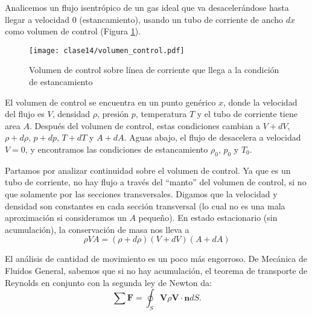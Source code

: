 Analicemos un flujo isentrópico de un gas ideal que va desacelerándose hasta llegar a velocidad 0 (estancamiento), usando un tubo de corriente de ancho $dx$ como volumen de control (Figura \ref{fig:volumen_control}).
%
\begin{figure}
\centering
\texttt{[image: clase14/volumen\_control.pdf]}
\caption{Volumen de control sobre línea de corriente que llega a la condición de estancamiento}
\label{fig:volumen_control}
\end{figure}
%
El volumen de control se encuentra en un punto genérico $x$, donde la velocidad del flujo es $V$, densidad $\rho$, presión $p$, temperatura $T$ y el tubo de corriente tiene area $A$. 
Después del volumen de control, estas condiciones cambian a $V+dV$, $\rho+d\rho$, $p+dp$, $T+dT$ y $A+dA$.
Aguas abajo, el flujo de desacelera a velocidad $V=0$, y encontramos las condiciones de estancamiento $\rho_0$, $p_0$ y $T_0$.

Partamos por analizar continuidad sobre el volumen de control.
Ya que es un tubo de corriente, no hay flujo a través del ``manto'' del volumen de control, si no que solamente por las secciones transversales.
Digamos que la velocidad y densidad son constantes en cada sección transversal (lo cual no es una mala aproximación si consideramos un $A$ pequeño).
En estado estacionario (sin acumulación), la conservación de masa nos lleva a
%
\begin{equation}\label{eq:continuidad_isentropico}
\rho VA = (\rho+d\rho)(V+dV)(A+dA)
\end{equation}

El análisis de cantidad de movimiento es un poco más engorroso.
De Mecánica de Fluidos General, sabemos que si no hay acumulación, el teorema de transporte de Reynolds en conjunto con la segunda ley de Newton da:
%
\begin{equation}\label{eq:momentum_isentropico}
\sum \mathbf{F} = \oint_S \mathbf{V} \rho \mathbf{V}\cdot\mathbf{n} dS.
\end{equation}

